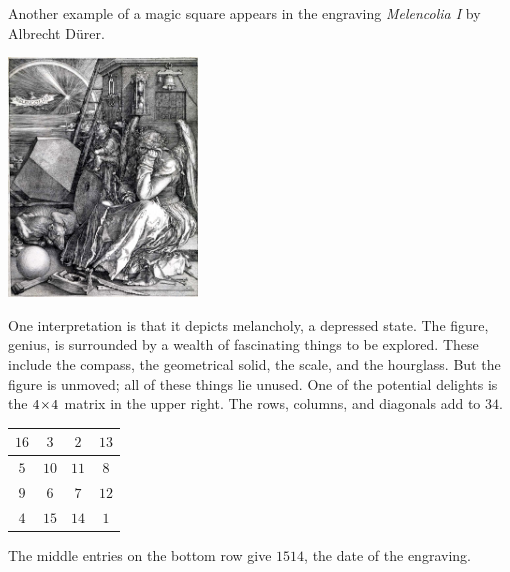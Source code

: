 Another example of a magic square appears in the engraving
\textit{Melencolia I} by Albrecht D\"urer.
\begin{center}
  \includegraphics[height=2.5in]{Melencolia.jpg} %
\end{center}
One interpretation is that it depicts melancholy, a depressed state.
The figure, genius,
is surrounded by a wealth of fascinating things to be explored.
These include
the compass, the geometrical solid, the scale, and the hourglass.
But the figure is unmoved; all of these things lie unused.
One of the potential delights is the $4 \! \times \! 4$ matrix in the upper right.
The rows, columns, and diagonals add to $34$.
\begin{center}
  \qquad
  \begin{tabular}{|c|c|c|c|}
    \hline
      $16$  &$3$  &$2$  &$13$  \\ \hline
      $5$   &$10$ &$11$ &$8$   \\ \hline
      $9$   &$6$  &$7$  &$12$  \\ \hline    
      $4$   &$15$ &$14$ &$1$  \\ \hline    
  \end{tabular}
\end{center}
The middle entries on the bottom row give $1514$, the 
date of the engraving.

